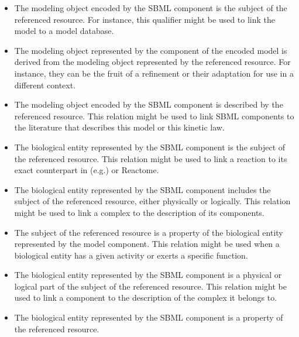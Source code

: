 \begin{itemize}

\item {} The modeling object encoded by the SBML
  component is the subject of the referenced resource. For
  instance, this qualifier might be used to link the model to a
  model database.

\item {}
    The modeling object
    represented by the component of the encoded model is derived
    from the modeling object represented by the referenced resource.
    For instance, they can be the fruit of a refinement or their
    adaptation for use in a different context.

\item {} The modeling object
  encoded by the SBML component is described by
  the referenced resource. This relation might be used to link
  SBML components to the literature that describes this model or
  this kinetic law.

\item {} The biological entity represented by the
  SBML component is the subject of the referenced resource. This
  relation might be used to link a reaction to its exact
  counterpart in (e.g.)  or Reactome.

\item {} The biological entity represented by
  the SBML component includes the subject of the referenced
  resource, either physically or logically. This relation might be
  used to link a complex to the description of its components.

\item {}
    The subject of the referenced
    resource is a property of the biological entity represented by
    the model component.  This relation might be used when a
    biological entity has a given activity or exerts a specific
    function.

\item {} The biological entity represented by
  the SBML component is a physical or logical part of the subject
  of the referenced resource. This relation might be used to link
  a component to the description of the complex it belongs to.

\item {}
    The biological entity
    represented by the SBML component is a property of the
    referenced resource.


\end{itemize}
